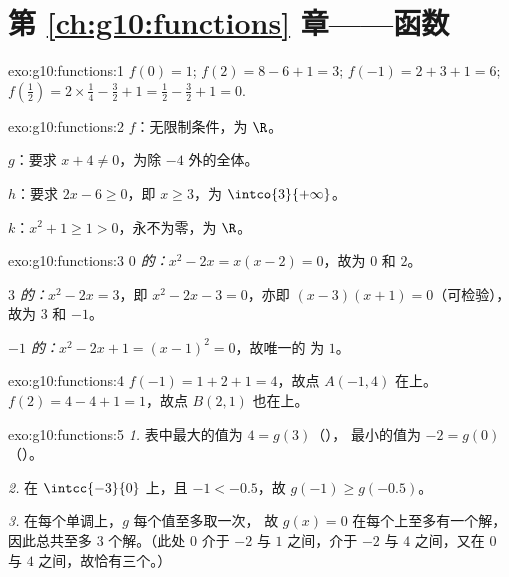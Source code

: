 \section*{第 \ref{ch:g10:functions} 章——函数}

\begin{solution}{exo:g10:functions:1}
$f(0) = 1$; \quad $f(2) = 8 - 6 + 1 = 3$; \quad
$f(-1) = 2 + 3 + 1 = 6$; \quad
$f\!\left(\tfrac12\right) = 2 \times \tfrac14 - \tfrac32 + 1 = \tfrac12 -
\tfrac32 + 1 = 0$.
\end{solution}

\begin{solution}{exo:g10:functions:2}
$f$：无限制条件，为 $\R$。

$g$：要求 $x + 4 \neq 0$，为除 $-4$ 外的全体。

$h$：要求 $2x - 6 \geq 0$，即 $x \geq 3$，为
$\intco{3}{+\infty}$。

$k$：$x^2 + 1 \geq 1 > 0$，永不为零，为 $\R$。
\end{solution}

\begin{solution}{exo:g10:functions:3}
\emph{$0$ 的：}$x^2 - 2x = x(x-2) = 0$，故为 $0$ 和 $2$。

\emph{$3$ 的：}$x^2 - 2x = 3$，即 $x^2 - 2x - 3 = 0$，亦即
$(x-3)(x+1) = 0$（可检验），故为 $3$ 和 $-1$。

\emph{$-1$ 的：}$x^2 - 2x + 1 = (x - 1)^2 = 0$，故唯一的
为 $1$。
\end{solution}

\begin{solution}{exo:g10:functions:4}
$f(-1) = 1 + 2 + 1 = 4$，故点 $A(-1, 4)$ 在上。
$f(2) = 4 - 4 + 1 = 1$，故点 $B(2, 1)$ 也在上。
\end{solution}

\begin{solution}{exo:g10:functions:5}
\emph{1.} 表中最大的值为 $4 = g(3)$（），
最小的值为 $-2 = g(0)$（）。

\emph{2.} 在 $\intcc{-3}{0}$ 上，且
$-1 < -0.5$，故 $g(-1) \geq g(-0.5)$。

\emph{3.} 在每个单调上，$g$ 每个值至多取一次，
故 $g(x) = 0$ 在每个上至多有一个解，因此总共至多 $3$
个解。（此处 $0$ 介于 $-2$ 与 $1$ 之间，介于 $-2$ 与
$4$ 之间，又在 $0$ 与 $4$ 之间，故恰有三个。）
\end{solution}

